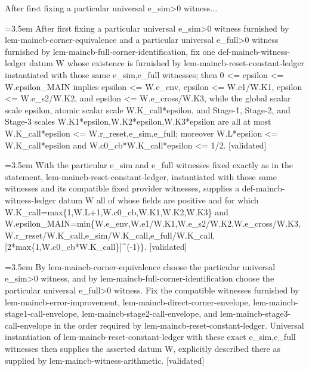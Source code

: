 \documentclass{article}
\newcommand{\step}[1]{\par\noindent\hangindent=3.5em\hangafter=1%
  \makebox[3.5em][l]{\textbf{#1.}}}
\newcommand{\steptag}[1]{\hfill{\small\textsf{[#1]}}}
\begin{document}
\begin{proofbox}{After first fixing a particular universal e\_sim>0 witness...}
\step{1} After first fixing a particular universal e\_sim>0 witness furnished by lem-maincb-corner-equivalence and a particular universal e\_full>0 witness furnished by lem-maincb-full-corner-identification, fix one def-maincb-witness-ledger datum W whose existence is furnished by lem-maincb-reset-constant-ledger instantiated with those same e\_sim,e\_full witnesses; then 0 <= epsilon <= W.epsilon\_MAIN implies epsilon <= W.e\_env, epsilon <= W.e1/W.K1, epsilon <= W.e\_s2/W.K2, and epsilon <= W.e\_cross/W.K3, while the global scalar scale epsilon, atomic scalar scale W.K\_call*epsilon, and Stage-1, Stage-2, and Stage-3 scales W.K1*epsilon,W.K2*epsilon,W.K3*epsilon are all at most W.K\_call*epsilon <= W.r\_reset,e\_sim,e\_full; moreover W.L*epsilon <= W.K\_call*epsilon and W.c0\_cb*W.K\_call*epsilon <= 1/2. \steptag{validated} \\[6pt]
\step{1.1} With the particular e\_sim and e\_full witnesses fixed exactly as in the statement, lem-maincb-reset-constant-ledger, instantiated with those same witnesses and its compatible fixed provider witnesses, supplies a def-maincb-witness-ledger datum W all of whose fields are positive and for which W.K\_call=max\{1,W.L+1,W.c0\_cb,W.K1,W.K2,W.K3\} and W.epsilon\_MAIN=min\{W.e\_env,W.e1/W.K1,W.e\_s2/W.K2,W.e\_cross/W.K3,W.r\_reset/W.K\_call,e\_sim/W.K\_call,e\_full/W.K\_call,[2*max\{1,W.c0\_cb*W.K\_call\}]\textasciicircum{}(-1)\}. \steptag{validated} \\[6pt]
\step{1.1.1} By lem-maincb-corner-equivalence choose the particular universal e\_sim>0 witness, and by lem-maincb-full-corner-identification choose the particular universal e\_full>0 witness. Fix the compatible witnesses furnished by lem-maincb-error-improvement, lem-maincb-direct-corner-envelope, lem-maincb-stage1-call-envelope, lem-maincb-stage2-call-envelope, and lem-maincb-stage3-call-envelope in the order required by lem-maincb-reset-constant-ledger. Universal instantiation of lem-maincb-reset-constant-ledger with these exact e\_sim,e\_full witnesses then supplies the asserted datum W, explicitly described there as supplied by lem-maincb-witness-arithmetic. \steptag{validated} \\[6pt]

\end{proofbox}
\end{document}

